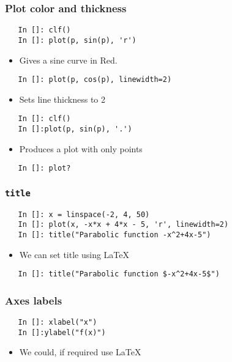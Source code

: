 \begin{frame}[fragile]
  \frametitle{Plot color and thickness}
  \begin{lstlisting}
   In []: clf()
   In []: plot(p, sin(p), 'r')
  \end{lstlisting}
  \begin{itemize}
  \item Gives a sine curve in Red. 
  \end{itemize}
  \begin{lstlisting}
   In []: plot(p, cos(p), linewidth=2)
  \end{lstlisting}
  \begin{itemize}
  \item Sets line thickness to 2
  \end{itemize}
  \begin{lstlisting}
   In []: clf()
   In []:plot(p, sin(p), '.')
  \end{lstlisting}
  \begin{itemize}
  \item Produces a plot with only points
  \end{itemize}
  \begin{lstlisting}
   In []: plot?
  \end{lstlisting}
\end{frame}

\begin{frame}[fragile]
  \frametitle{\texttt{title}}
  \begin{lstlisting}
   In []: x = linspace(-2, 4, 50)
   In []: plot(x, -x*x + 4*x - 5, 'r', linewidth=2)
   In []: title("Parabolic function -x^2+4x-5")
  \end{lstlisting}
  \begin{itemize}
  \item We can set title using \LaTeX~ 
  \end{itemize}
  \begin{lstlisting}
   In []: title("Parabolic function $-x^2+4x-5$")
  \end{lstlisting} 
\end{frame}

\begin{frame}[fragile]
  \frametitle{Axes labels}
  \begin{lstlisting}
   In []: xlabel("x")
   In []:ylabel("f(x)")
  \end{lstlisting}
  \begin{itemize}
  \item We could, if required use \LaTeX~ 
  \end{itemize}
\end{frame}

